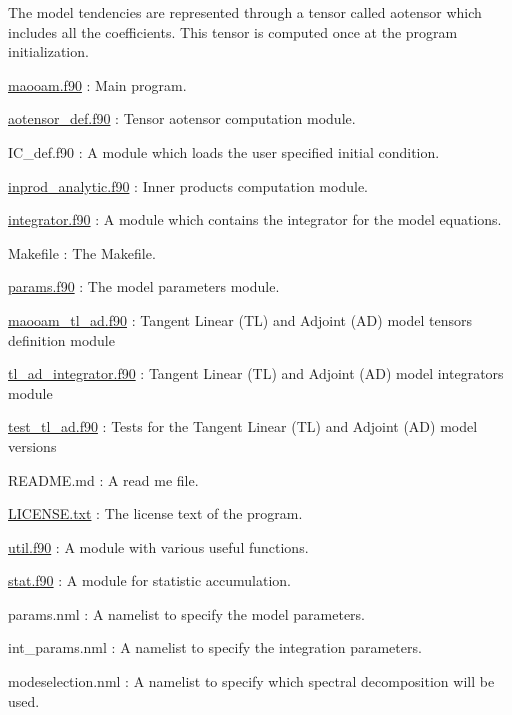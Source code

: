 The model tendencies are represented through a tensor called aotensor which includes all the coefficients. This tensor is computed once at the program initialization.


\begin{DoxyItemize}
\item \hyperlink{maooam_8f90}{maooam.\-f90} \-: Main program.
\item \hyperlink{aotensor__def_8f90}{aotensor\-\_\-def.\-f90} \-: Tensor aotensor computation module.
\item I\-C\-\_\-def.\-f90 \-: A module which loads the user specified initial condition.
\item \hyperlink{inprod__analytic_8f90}{inprod\-\_\-analytic.\-f90} \-: Inner products computation module.
\item \hyperlink{integrator_8f90}{integrator.\-f90} \-: A module which contains the integrator for the model equations.
\item Makefile \-: The Makefile.
\item \hyperlink{params_8f90}{params.\-f90} \-: The model parameters module.
\item \hyperlink{maooam__tl__ad_8f90}{maooam\-\_\-tl\-\_\-ad.\-f90} \-: Tangent Linear (T\-L) and Adjoint (A\-D) model tensors definition module
\item \hyperlink{tl__ad__integrator_8f90}{tl\-\_\-ad\-\_\-integrator.\-f90} \-: Tangent Linear (T\-L) and Adjoint (A\-D) model integrators module
\item \hyperlink{test__tl__ad_8f90}{test\-\_\-tl\-\_\-ad.\-f90} \-: Tests for the Tangent Linear (T\-L) and Adjoint (A\-D) model versions
\item R\-E\-A\-D\-M\-E.\-md \-: A read me file.
\item \hyperlink{LICENSE_8txt}{L\-I\-C\-E\-N\-S\-E.\-txt} \-: The license text of the program.
\item \hyperlink{util_8f90}{util.\-f90} \-: A module with various useful functions.
\item \hyperlink{stat_8f90}{stat.\-f90} \-: A module for statistic accumulation.
\item params.\-nml \-: A namelist to specify the model parameters.
\item int\-\_\-params.\-nml \-: A namelist to specify the integration parameters.
\item modeselection.\-nml \-: A namelist to specify which spectral decomposition will be used. 


\end{DoxyItemize}

